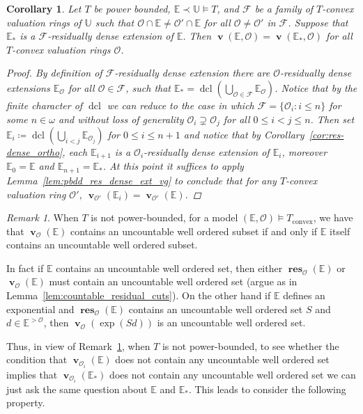 \documentclass{amsart}
\newtheorem{corollary}[theorem]{Corollary}
\theoremstyle{remark}
\newtheorem{remark}[theorem]{Remark}
\theoremstyle{definition}
\theoremstyle{plain}
\newcommand{\bE}{\mathbb E}
\newcommand{\bU}{\mathbb U}
\newcommand{\cF}{\mathcal F}
\newcommand{\cO}{\mathcal O}
\newcommand{\convex}{\mathrm{convex}}
\DeclareMathOperator{\val}{\mathbf{v}}
\DeclareMathOperator{\res}{\mathbf{res}}
\DeclareMathOperator{\dcl}{\mathrm{dcl}}
\theoremstyle{plain}
\begin{document}
\begin{corollary}
    Let $T$ be power bounded, $\bE\prec \bU \models T$, and $\cF$ be a family of $T$-convex valuation rings of $\bU$ such that $\cO\cap \bE \neq \cO' \cap \bE$ for all $\cO \neq \cO'$ in $\cF$. Suppose that $\bE_*$ is a $\cF$-residually dense extension of $\bE$. Then $\val(\bE, \cO)=\val(\bE_*, \cO)$ for all $T$-convex valuation rings $\cO$.
    \begin{proof}
        By definition of $\cF$-residually dense extension there are $\cO$-residually dense extensions $\bE_\cO$ for all $\cO \in \cF$, such that $\bE_*=\dcl(\bigcup_{\cO \in \cF}\bE_\cO)$.
        Notice that by the finite character of $\dcl$ we can reduce to the case in which $\cF=\{\cO_i: i\le n\}$ for some $n\in \omega$ and without loss of generality $\cO_i \supsetneq \cO_j$ for all $0 \le i < j \le n$.
        Then set $\bE_i\coloneqq \dcl(\bigcup_{i<j} \bE_{\cO_j})$ for $0 \le i\le n+1$ and notice that by Corollary~\ref{cor:res-dense_ortho}, each $\bE_{i+1}$ is a $\cO_i$-residually dense extension of $\bE_i$, moreover $\bE_0=\bE$ and $\bE_{n+1}=\bE_*$. At this point it suffices to apply Lemma~\ref{lem:pbdd_res_dense_ext_vg} to conclude that for any $T$-convex valuation ring $\cO'$, $\val_{\cO'}(\bE_i)=\val_{\cO'}(\bE)$.
    \end{proof}
\end{corollary}

\begin{remark}\label{rmk:exponential_ctbl_condition}
    When $T$ is not power-bounded, for a model $(\bE, \cO)\models T_\convex$, we have that $\val_\cO(\bE)$ contains an uncountable well ordered subset if and only if $\bE$ itself contains an uncountable well ordered subset.

    In fact if $\bE$ contains an uncountable well ordered set, then either $\res_\cO(\bE)$ or $\val_\cO(\bE)$ must contain an uncountable well ordered set (argue as in Lemma~\ref{lem:countable_residual_cuts}). On the other hand if $\bE$ defines an exponential and $\res_{\cO}(\bE)$ contains an uncountable well ordered set $S$ and $d \in \bE^{>\cO}$, then $\val_\cO(\exp(Sd))$ is an uncountable well ordered set.

\end{remark}

Thus, in view of Remark~\ref{rmk:exponential_ctbl_condition}, when $T$ is not power-bounded, to see whether the condition that $\val_{\cO_i}(\bE)$ does not contain any uncountable well ordered set implies that $\val_{\cO_i}(\bE_*)$ does not contain any uncountable well ordered set we can just ask the same question about $\bE$ and $\bE_*$. This leads to consider the following property.
\end{document}
